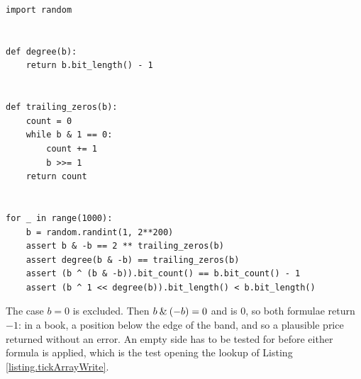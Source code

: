 \begin{lstlisting}[caption={$b \bitAnd (-b) = 2^{\trailingZeros(b)}$.}, label=listing.lowestSetBit]
import random


def degree(b):
    return b.bit_length() - 1


def trailing_zeros(b):
    count = 0
    while b & 1 == 0:
        count += 1
        b >>= 1
    return count


for _ in range(1000):
    b = random.randint(1, 2**200)
    assert b & -b == 2 ** trailing_zeros(b)
    assert degree(b & -b) == trailing_zeros(b)
    assert (b ^ (b & -b)).bit_count() == b.bit_count() - 1
    assert (b ^ 1 << degree(b)).bit_length() < b.bit_length()
\end{lstlisting}

The case $b = 0$ is excluded.
Then $b \mathbin{\&} (-b) = 0$ and  is $0$,
so both formulae return $-1$:
in a book, a position below the edge of the band,
and so a plausible price returned without an error.
An empty side has to be tested for before either formula is applied,
which is the test  opening the lookup of Listing \ref{listing.tickArrayWrite}.
